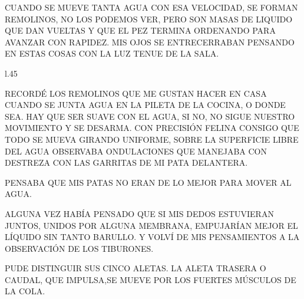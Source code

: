 CUANDO SE MUEVE TANTA AGUA CON ESA VELOCIDAD, SE FORMAN REMOLINOS, NO LOS PODEMOS VER, PERO SON MASAS DE LIQUIDO QUE DAN VUELTAS Y QUE EL PEZ TERMINA  ORDENANDO PARA AVANZAR CON RAPIDEZ. MIS OJOS SE ENTRECERRABAN PENSANDO EN ESTAS COSAS CON LA LUZ TENUE DE LA SALA.
\newpage
{}
\begin{wrapfigure}[10]{l}{.45\textwidth}\vspace{-1.25cm}%
\end{wrapfigure}
RECORDÉ LOS REMOLINOS QUE ME GUSTAN HACER EN CASA CUANDO SE JUNTA AGUA EN LA PILETA DE LA COCINA, O DONDE SEA. HAY QUE SER SUAVE CON EL AGUA, SI NO, NO SIGUE NUESTRO MOVIMIENTO Y SE DESARMA. CON PRECISIÓN FELINA CONSIGO QUE TODO SE MUEVA GIRANDO UNIFORME, SOBRE LA SUPERFICIE LIBRE DEL AGUA OBSERVABA ONDULACIONES QUE MANEJABA CON DESTREZA CON LAS GARRITAS DE MI PATA DELANTERA.

PENSABA QUE MIS PATAS NO ERAN DE LO MEJOR PARA MOVER AL AGUA. 

\newpage
{}

ALGUNA VEZ HABÍA PENSADO QUE SI MIS DEDOS ESTUVIERAN JUNTOS, UNIDOS POR ALGUNA MEMBRANA, EMPUJARÍAN MEJOR EL LÍQUIDO SIN TANTO BARULLO. Y VOLVÍ DE MIS PENSAMIENTOS A LA OBSERVACIÓN DE LOS TIBURONES.

PUDE DISTINGUIR SUS CINCO ALETAS. LA ALETA TRASERA O CAUDAL, QUE IMPULSA,SE MUEVE POR LOS FUERTES MÚSCULOS DE LA COLA.

\begin{center}

\begin{minipage}[r]{.7\textwidth}%
\end{minipage}

\end{center}
\newpage
{}

